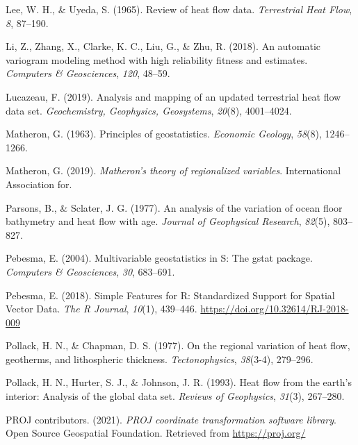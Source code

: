 \documentclass[draft,linenumbers]{agujournal2018}
\begin{document}
\leavevmode{}%
Lee, W. H., \& Uyeda, S. (1965). Review of heat flow data.
\emph{Terrestrial Heat Flow}, \emph{8}, 87--190.

\leavevmode{}%
Li, Z., Zhang, X., Clarke, K. C., Liu, G., \& Zhu, R. (2018). An
automatic variogram modeling method with high reliability fitness and
estimates. \emph{Computers \& Geosciences}, \emph{120}, 48--59.

\leavevmode{}%
Lucazeau, F. (2019). Analysis and mapping of an updated terrestrial heat
flow data set. \emph{Geochemistry, Geophysics, Geosystems},
\emph{20}(8), 4001--4024.

\leavevmode{}%
Matheron, G. (1963). Principles of geostatistics. \emph{Economic
Geology}, \emph{58}(8), 1246--1266.

\leavevmode{}%
Matheron, G. (2019). \emph{Matheron's theory of regionalized variables}.
International Association for.

\leavevmode{}%
Parsons, B., \& Sclater, J. G. (1977). An analysis of the variation of
ocean floor bathymetry and heat flow with age. \emph{Journal of
Geophysical Research}, \emph{82}(5), 803--827.

\leavevmode{}%
Pebesma, E. (2004). Multivariable geostatistics in {S}: The gstat
package. \emph{Computers \& Geosciences}, \emph{30}, 683--691.

\leavevmode{}%
Pebesma, E. (2018). {Simple Features for R: Standardized Support for
Spatial Vector Data}. \emph{{The R Journal}}, \emph{10}(1), 439--446.
\url{https://doi.org/10.32614/RJ-2018-009}

\leavevmode{}%
Pollack, H. N., \& Chapman, D. S. (1977). On the regional variation of
heat flow, geotherms, and lithospheric thickness. \emph{Tectonophysics},
\emph{38}(3-4), 279--296.

\leavevmode{}%
Pollack, H. N., Hurter, S. J., \& Johnson, J. R. (1993). Heat flow from
the earth's interior: Analysis of the global data set. \emph{Reviews of
Geophysics}, \emph{31}(3), 267--280.

\leavevmode{}%
PROJ contributors. (2021). \emph{{PROJ} coordinate transformation
software library}. Open Source Geospatial Foundation. Retrieved from
\url{https://proj.org/}
\end{document}
